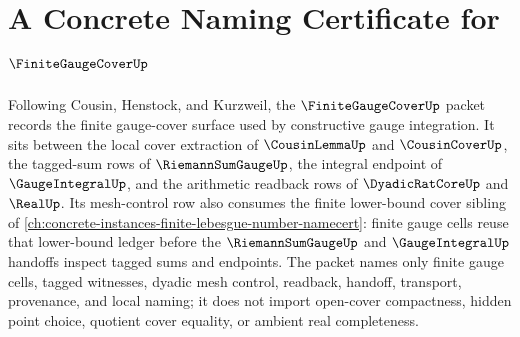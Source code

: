 \chapter{A Concrete Naming Certificate for $\FiniteGaugeCoverUp$}
\label{ch:concrete-instances-finite-gauge-cover-namecert}

Following Cousin, Henstock, and Kurzweil, the $\FiniteGaugeCoverUp$ packet records the finite gauge-cover surface used by constructive gauge integration. It sits between the local cover extraction of $\CousinLemmaUp$ and $\CousinCoverUp$, the tagged-sum rows of $\RiemannSumGaugeUp$, the integral endpoint of $\GaugeIntegralUp$, and the arithmetic readback rows of $\DyadicRatCoreUp$ and $\RealUp$. Its mesh-control row also consumes the finite lower-bound cover sibling of \autoref{ch:concrete-instances-finite-lebesgue-number-namecert}: finite gauge cells reuse that lower-bound ledger before the $\RiemannSumGaugeUp$ and $\GaugeIntegralUp$ handoffs inspect tagged sums and endpoints. The packet names only finite gauge cells, tagged witnesses, dyadic mesh control, readback, handoff, transport, provenance, and local naming; it does not import open-cover compactness, hidden point choice, quotient cover equality, or ambient real completeness.

